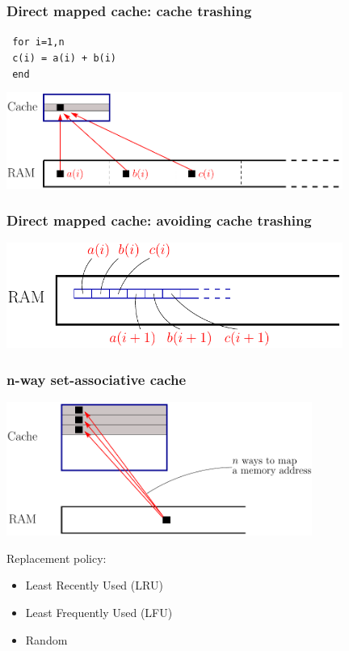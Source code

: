 \documentclass{beamer}
\begin{document}
\begin{frame}\frametitle{Direct mapped cache: cache trashing}
\vspace{.5cm}
\hspace{3cm}\texttt{   for i=1,n}           \\
\hspace{4cm}\texttt{          c(i) = a(i) + b(i)}\\
\hspace{3cm}\texttt{   end}

\begin{center}
  \includegraphics[width=11cm]{../../notes/01.single/CacheTrashing}
\end{center}
\end{frame}

\begin{frame}\frametitle{Direct mapped cache: avoiding cache trashing}
\begin{center}
  \includegraphics[width=11cm]{../../notes/01.single/AdjacentMemory}
\end{center}
\end{frame}

\begin{frame}\frametitle{n-way set-associative cache}
\begin{center}
  \includegraphics[width=10cm]{../../notes/01.single/NWayCache}
\end{center}
\vspace{.5cm}
Replacement policy: 
\begin{itemize}
  \item Least Recently Used (LRU)
  \item Least Frequently Used (LFU)
  \item Random
\end{itemize}
\end{frame}
\end{document}
